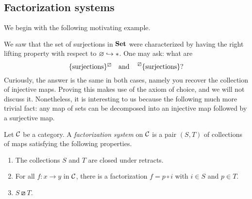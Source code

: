 \subsection{Factorization systems}
We begin with the following motivating example.
\begin{example}
	We saw that the set of surjections in \(\mathbf{Set}\) were characterized by having the right lifting property with respect to \(\varnothing\hookrightarrow*\). One may ask: what are
	\[  \{\text{surjections}\}^\boxslash \quad\text{and}\quad\prescript{\boxslash}{}{\{\text{surjections}\}}? \]
	Curiously, the answer is the same in both cases, namely you recover the collection of injective maps. Proving this makes use of the axiom of choice, and we will not discuss it.
	Nonetheless, it is interesting to us because the following much more trivial fact: any map of sets can be decomposed into an injective map followed by a surjective map.
\end{example}
\begin{definition}\label{definition:factorization-system}
	Let \(\mathcal{C}\) be a category. A \emph{factorization system} on \(\mathcal{C}\) is a pair \((S,T)\) of collections of maps satisfying the following properties.
	\begin{enumerate}[label=(\alph*)]
		\item The collections \(S\) and \(T\) are closed under retracts.
		\item For all \(f\!:x\to y\) in \(\mathcal{C}\), there is a factorization \(f = p\circ i\) with \(i\in S\) and \(p\in T\).
		\item \(S\boxslash T\).
	\end{enumerate}
\end{definition}

